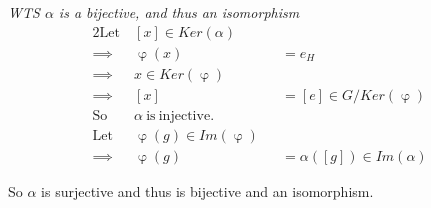 \documentclass[11pt,a4paper]{article}
\begin{document}
\textit{WTS $\alpha$ is a bijective, and thus an isomorphism}
\begin{alignat*}{2}
  \mathrm{Let\ }& [x] \in Ker(\alpha) \\
  \implies& \upvarphi(x) &&= e_H\\
  \implies& x \in Ker(\upvarphi) \\
  \implies& [x] &&= [e] \in G/Ker(\upvarphi)\\
  \mathrm{So\ \ }& \alpha \mathrm{\ is\ injective.}\\
  \mathrm{Let\ }& \upvarphi(g) \in Im(\upvarphi)\\
  \implies& \upvarphi(g) &&= \alpha([g]) \in Im(\alpha)
\end{alignat*}

So $\alpha$ is surjective and thus is bijective and an isomorphism.
\end{document}
